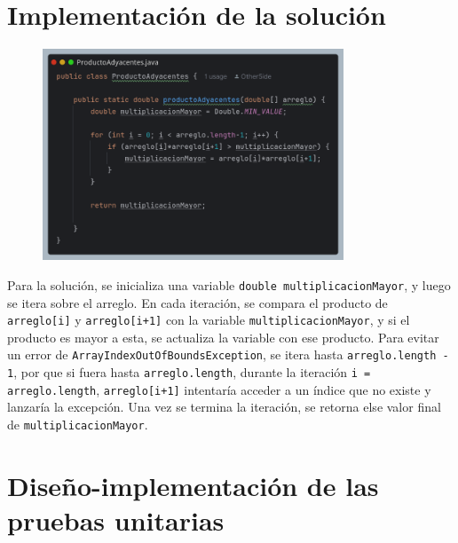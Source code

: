 \documentclass{article}
\begin{document}
\section{Implementación de la solución}

\begin{figure}[H]
    \centering
    \includegraphics[width=0.8\textwidth]{imagenes/solutionv1.png}
\end{figure}

Para la solución, se inicializa una variable \texttt{double multiplicacionMayor}, y luego se itera sobre el arreglo. En cada iteración, se compara el producto de \texttt{arreglo[i]} y \texttt{arreglo[i+1]} con la variable \texttt{multiplicacionMayor}, y si el producto es mayor a esta, se actualiza la variable con ese producto.
Para evitar un error de \texttt{ArrayIndexOutOfBoundsException}, se itera hasta \texttt{arreglo.length - 1}, por que si fuera hasta \texttt{arreglo.length}, durante la iteración \texttt{i = arreglo.length}, \texttt{arreglo[i+1]} intentaría acceder a un índice que no existe y lanzaría la excepción. Una vez se termina la iteración, se retorna else valor final de \texttt{multiplicacionMayor}.

\section{Diseño-implementación de las pruebas unitarias}
\end{document}

